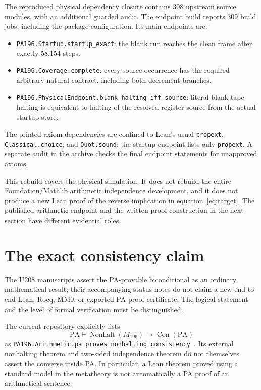\documentclass[11pt,letterpaper]{article}
\newcommand{\PA}{\mathrm{PA}}
\newcommand{\Con}{\operatorname{Con}}
\newcommand{\NH}{\operatorname{Nonhalt}}
\newcommand{\file}[1]{\texttt{\nolinkurl{#1}}}
\begin{document}
The reproduced physical dependency closure contains 308 upstream source
modules, with an additional guarded audit. The endpoint build reports
309 build jobs, including the package configuration. Its
main endpoints are:
\begin{itemize}
\item \file{PA196.Startup.startup_exact}: the blank run reaches the clean
  frame after exactly 58,154 steps.
\item \file{PA196.Coverage.complete}: every source occurrence has the
  required arbitrary-natural contract, including both decrement branches.
\item \file{PA196.PhysicalEndpoint.blank_halting_iff_source}: literal
  blank-tape halting is equivalent to halting of the resolved register
  source from the actual startup store.
\end{itemize}
The printed axiom dependencies are confined to Lean's usual
\file{propext}, \file{Classical.choice}, and \file{Quot.sound}; the startup
endpoint lists only \file{propext}. A separate audit in the archive checks
the final endpoint statements for unapproved axioms.

This rebuild covers the physical simulation. It does not rebuild the
entire Foundation/Mathlib arithmetic independence development, and it does
not produce a new Lean proof of the reverse implication in
equation~\eqref{eq:target}. The published arithmetic endpoint and the
written proof construction in the next section have different evidential
roles.

\section{The exact consistency claim}
\label{sec:status}

The U208 manuscripts assert the PA-provable biconditional as an ordinary
mathematical result; their accompanying status notes do not claim a new
end-to-end Lean, Rocq, MM0, or exported PA proof certificate. The logical
statement and the level of formal verification must be distinguished.

The current repository explicitly lists
\[
 \PA\vdash\NH(M_{196})\to\Con(\PA)
\]
as \file{PA196.Arithmetic.pa_proves_nonhalting_consistency}~\cite{status}.
Its external nonhalting theorem and two-sided independence theorem do not
themselves assert the converse inside PA. In particular, a Lean theorem
proved using a standard model in the metatheory is not automatically a PA
proof of an arithmetical sentence.
\end{document}
